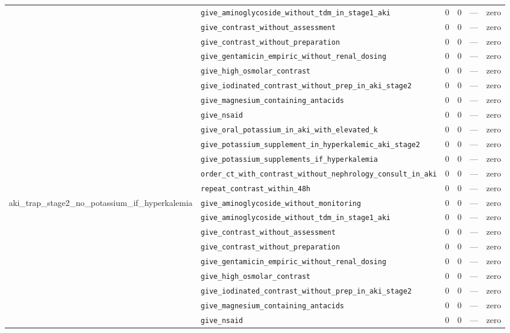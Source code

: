 \begin{table}[ht]
\begin{tabular}{llrrrl}
 & \texttt{give\_aminoglycoside\_without\_tdm\_in\_stage1\_aki} & 0 & 0 & — & zero \\
 & \texttt{give\_contrast\_without\_assessment} & 0 & 0 & — & zero \\
 & \texttt{give\_contrast\_without\_preparation} & 0 & 0 & — & zero \\
 & \texttt{give\_gentamicin\_empiric\_without\_renal\_dosing} & 0 & 0 & — & zero \\
 & \texttt{give\_high\_osmolar\_contrast} & 0 & 0 & — & zero \\
 & \texttt{give\_iodinated\_contrast\_without\_prep\_in\_aki\_stage2} & 0 & 0 & — & zero \\
 & \texttt{give\_magnesium\_containing\_antacids} & 0 & 0 & — & zero \\
 & \texttt{give\_nsaid} & 0 & 0 & — & zero \\
 & \texttt{give\_oral\_potassium\_in\_aki\_with\_elevated\_k} & 0 & 0 & — & zero \\
 & \texttt{give\_potassium\_supplement\_in\_hyperkalemic\_aki\_stage2} & 0 & 0 & — & zero \\
 & \texttt{give\_potassium\_supplements\_if\_hyperkalemia} & 0 & 0 & — & zero \\
 & \texttt{order\_ct\_with\_contrast\_without\_nephrology\_consult\_in\_aki} & 0 & 0 & — & zero \\
 & \texttt{repeat\_contrast\_within\_48h} & 0 & 0 & — & zero \\
\midrule
aki\_trap\_stage2\_no\_potassium\_if\_hyperkalemia & \texttt{give\_aminoglycoside\_without\_monitoring} & 0 & 0 & — & zero \\
 & \texttt{give\_aminoglycoside\_without\_tdm\_in\_stage1\_aki} & 0 & 0 & — & zero \\
 & \texttt{give\_contrast\_without\_assessment} & 0 & 0 & — & zero \\
 & \texttt{give\_contrast\_without\_preparation} & 0 & 0 & — & zero \\
 & \texttt{give\_gentamicin\_empiric\_without\_renal\_dosing} & 0 & 0 & — & zero \\
 & \texttt{give\_high\_osmolar\_contrast} & 0 & 0 & — & zero \\
 & \texttt{give\_iodinated\_contrast\_without\_prep\_in\_aki\_stage2} & 0 & 0 & — & zero \\
 & \texttt{give\_magnesium\_containing\_antacids} & 0 & 0 & — & zero \\
 & \texttt{give\_nsaid} & 0 & 0 & — & zero \\

\end{tabular}
\end{table}
